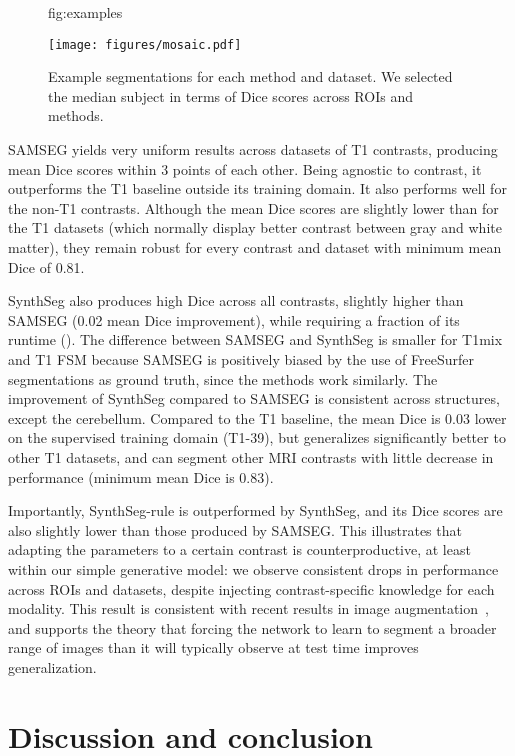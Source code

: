 \documentclass{midl}
\newcommand{\netname}{SynthSeg}
\begin{document}
\begin{figure}[t]
\floatconts
  {fig:examples}
  {\caption{Example segmentations for each method and dataset. We selected the median subject in terms of Dice scores across ROIs and methods.}}
  {\texttt{[image: figures/mosaic.pdf]}}
\end{figure}

SAMSEG yields very uniform results across datasets of T1 contrasts, producing mean Dice scores within 3 points of each other. Being agnostic to contrast, it outperforms the T1 baseline outside its training domain. It also performs well for the non-T1 contrasts. Although the mean Dice scores are slightly lower than for the T1 datasets (which normally display better contrast between gray and white matter), they remain robust for every contrast and dataset with minimum mean Dice of 0.81.

\netname{} also produces high Dice across all contrasts, slightly higher than SAMSEG (0.02 mean Dice improvement), while requiring a fraction of its runtime (). The difference between SAMSEG and \netname{} is smaller for T1mix and T1 FSM because SAMSEG is positively biased by the use of FreeSurfer segmentations as ground truth, since the methods work similarly. The improvement of \netname{} compared to SAMSEG is consistent across structures, except the cerebellum. Compared to the T1 baseline, the mean Dice is 0.03 lower on the supervised training domain (T1-39), but generalizes significantly better to other T1 datasets, and can segment other MRI contrasts with little decrease in performance (minimum mean Dice is 0.83).

Importantly, \netname{}-rule is outperformed by \netname{}, and its Dice scores are also slightly lower than those produced by SAMSEG. This illustrates that adapting the parameters to a certain contrast is counterproductive, at least within our simple generative model: we observe consistent drops in performance across ROIs and datasets, despite injecting contrast-specific knowledge for each modality. This result is consistent  with recent results in image augmentation~\cite{chaitanya_semi-supervised_2019}, and supports the theory that forcing the network to learn to segment a broader range of images than it will typically observe at test time improves generalization. 




\section{Discussion and conclusion}
\end{document}
